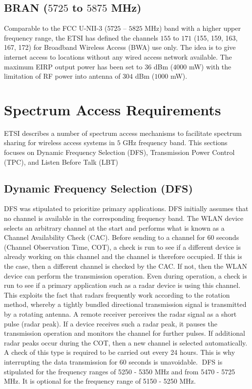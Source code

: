 \subsection{BRAN ($5725$ to $5875$ MHz)}

Comparable to the FCC U-NII-3 ($5725$ – $5825$ MHz) band with a higher upper frequency range, the ETSI has defined the channels $155$ to $171$ (155, 159, 163, 167, 172) for Broadband Wireless Access (BWA) use only. The idea is to give internet access to locations without any wired access network available. The maximum EIRP output power has been set to $36$ dBm ($4000$ mW) with the limitation of RF power into antenna of $304$ dBm ($1000$ mW).


\section{Spectrum Access Requirements}
\label{subsec:ETSI-overview}

ETSI describes a number of spectrum access mechanisms to facilitate spectrum sharing for wireless access systems in $5$ GHz frequency band. This sections focuses on Dynamic Frequency Selection (DFS), Transmission Power Control (TPC), and Listen Before Talk (LBT)

\subsection{Dynamic Frequency Selection (DFS)}

DFS was stipulated to prioritize primary applications. DFS initially assumes that no channel is available in the corresponding frequency band. The WLAN device selects an arbitrary channel at the start and performs what is known as a Channel Availability Check (CAC). Before sending to a channel for 60 seconds (Channel Observation Time, COT), a check is run to see if a different device is already working on this channel and the channel is therefore occupied. If this is the case, then a different channel is checked by the CAC. If not, then the WLAN device can perform the transmission operation. Even during operation, a check is run to see if a primary application such as a radar device is using this channel. This exploits the fact that radars frequently work according to the rotation method, whereby a tightly bundled directional transmission signal is transmitted by a rotating antenna. A remote receiver perceives the radar signal as a short pulse (radar peak). If a device receives such a radar peak, it pauses the transmission operation and monitors the channel for further pulses. If additional radar peaks occur during the COT, then a new channel is selected automatically. A check of this type is required to be carried out every 24 hours. This is why interrupting the data transmission for 60 seconds is unavoidable. DFS is stipulated for the frequency ranges of 5250 - 5350 MHz and from 5470 - 5725
MHz. It is optional for the frequency range of 5150 - 5250 MHz. 

